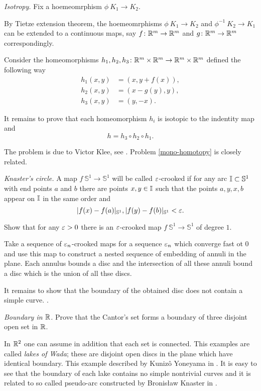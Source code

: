 \textit{Isotropy.}
Fix a hoemeomrphism $\phi\:K_1\to K_2$.

By Tietze extension theorem,
the hoemeomrphisms $\phi\:K_1\to K_2$ and $\phi^{-1}\:K_2\to K_1$ can be extended to a continuous maps,
say $f\colon\mathbb{R}^m\to \mathbb{R}^m$ and $g\colon\mathbb{R}^m\to \mathbb{R}^m$ correspondingly.

Consider the homeomorphisms
$h_1, h_2, h_3\colon\mathbb{R}^m\times\mathbb{R}^m\to\mathbb{R}^m\times\mathbb{R}^m$ defined the following way
\begin{align*}
h_1(x,y)&=(x,y+f(x)),
\\
h_2(x,y)&=(x-g(y),y),
\\ 
h_3(x,y)&=(y,-x).
\end{align*}

It remains to prove that each homeomorphism $h_i$ is isotopic to the indentity map and
\[h=h_3\circ h_2\circ h_1.\] 

The problem is due to Victor Klee, 
see \cite{klee}.
Problem \ref{mono-homotopy} is closely related.


\textit{Knaster's circle.}
A map $f\:\mathbb S^1\to\mathbb S^1$ will be called $\varepsilon$-crooked 
if for any arc $\mathbb{I}\subset \mathbb S^1$ with end points $a$ and $b$ there are points $x,y\in \mathbb{I}$ such that the points $a,y,x,b$ appear on $\mathbb{I}$ in the same order and
\[|f(x)-f(a)|_{\mathbb S^1},|f(y)-f(b)|_{\mathbb S^1}<\varepsilon.\]

Show that for any $\varepsilon>0$ there is an $\varepsilon$-crooked map $f\:\mathbb S^1\to\mathbb S^1$ of degree $1$.

Take a sequence of $\varepsilon_n$-crooked maps for a sequence $\varepsilon_n$ which converge fast ot $0$
and use this map to construct a nested sequence of embedding of annuli in the plane.
Each annulus bounds a disc and the intersection 
of all these annuli bound a disc which is the union of all thse discs.

It remains to show that the boundary of the obtained disc does not contain a simple curve.
\cite{wayne}.

\textit{Boundary in $\mathbb{R}$.}
Prove that the Cantor's set forms a boundary of three disjoint open set in $\mathbb{R}$.

In $\mathbb{R}^2$
one can assume in addition that each set is connected.
This examples are called \emph{lakes of Wada};
these are disjoint open discs in the plane which have identical boundary.   
This example described by Kuniz\^{o} Yoneyama in \cite{yoneyama}.
It is easy to see that the boundary of each lake contains no simple nontrivial curves
and it is related to so called pseudo-arc constructed by Bronis{\l}aw Knaster in \cite{knaster}. 

